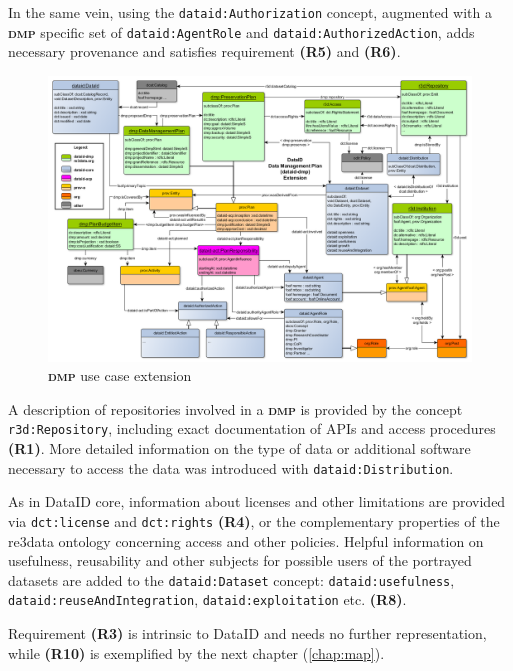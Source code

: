\documentclass[a4paper,english,twoside,BCOR1.5cm,headsepline,DIV12,appendixprefix,final,12pt]{scrbook}
\newcommand{\dmp}{{\scshape\bfseries dmp}\xspace}
\newcommand{\prop}[1]{{{\texttt{#1}}}}
\begin{document}
In the same vein, using the \prop{dataid:Authorization} concept, augmented with a \dmp specific set of \prop{dataid:AgentRole} and \prop{dataid:AuthorizedAction}, adds necessary provenance and satisfies requirement \textbf{(R5)} and \textbf{(R6)}.

\begin{figure}
\vspace*{-0.8cm}
\centering
\includegraphics[angle=90, width=\textwidth]{images/DmpOntologyExt.png}
  \caption{\dmp use case extension}
  \label{fig:dmp}
\end{figure}

A description of repositories involved in a \dmp is provided by the concept \prop{r3d:Repository}, including exact documentation of APIs and access procedures \textbf{(R1)}. More detailed information on the type of data or additional software necessary to access the data was introduced with \prop{dataid:Distribution}.

As in DataID core, information about licenses and other limitations are provided via \prop{dct:license} and \prop{dct:rights} \textbf{(R4)}, or the complementary properties of the re3data ontology concerning access and other policies.
Helpful information on usefulness, reusability and other subjects for possible users of the portrayed datasets are added to the \prop{dataid:Dataset} concept: \prop{dataid:usefulness}, \prop{dataid:reuseAndIntegration}, \prop{dataid:exploitation} etc. \textbf{(R8)}.

Requirement \textbf{(R3)} is intrinsic to DataID and needs no further representation, while \textbf{(R10)} is exemplified by the next chapter (\cref{chap:map}). 
\end{document}
